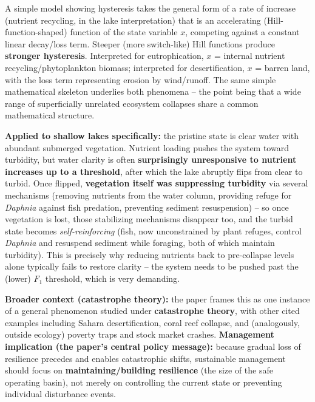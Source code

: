 \documentclass[11pt,a4paper]{article}
\begin{document}
\begin{papbox}[title={Paper Summary: Scheffer, Carpenter, Foley, Folke \& Walker (2001), \textit{Nature} 413:591--596 -- ``Catastrophic Shifts in Ecosystems''}]
\begin{keybox}[title={The minimal ``Box 1'' mathematical model (lakes/desertification)}]
A simple model showing hysteresis takes the general form of a rate of increase (nutrient recycling, in the lake interpretation) that is an accelerating (Hill-function-shaped) function of the state variable $x$, competing against a constant linear decay/loss term. Steeper (more switch-like) Hill functions produce \textbf{stronger hysteresis}. Interpreted for eutrophication, $x$ = internal nutrient recycling/phytoplankton biomass; interpreted for desertification, $x$ = barren land, with the loss term representing erosion by wind/runoff. The same simple mathematical skeleton underlies both phenomena -- the point being that a wide range of superficially unrelated ecosystem collapses share a common mathematical structure.
\end{keybox}

\textbf{Applied to shallow lakes specifically:} the pristine state is clear water with abundant submerged vegetation. Nutrient loading pushes the system toward turbidity, but water clarity is often \textbf{surprisingly unresponsive to nutrient increases up to a threshold}, after which the lake abruptly flips from clear to turbid. Once flipped, \textbf{vegetation itself was suppressing turbidity} via several mechanisms (removing nutrients from the water column, providing refuge for \textit{Daphnia} against fish predation, preventing sediment resuspension) -- so once vegetation is lost, those stabilizing mechanisms disappear too, and the turbid state becomes \emph{self-reinforcing} (fish, now unconstrained by plant refuges, control \textit{Daphnia} and resuspend sediment while foraging, both of which maintain turbidity). This is precisely why reducing nutrients back to pre-collapse levels alone typically fails to restore clarity -- the system needs to be pushed past the (lower) $F_1$ threshold, which is very demanding.

\textbf{Broader context (catastrophe theory):} the paper frames this as one instance of a general phenomenon studied under \textbf{catastrophe theory}, with other cited examples including Sahara desertification, coral reef collapse, and (analogously, outside ecology) poverty traps and stock market crashes. \textbf{Management implication (the paper's central policy message):} because gradual loss of resilience precedes and enables catastrophic shifts, sustainable management should focus on \textbf{maintaining/building resilience} (the size of the safe operating basin), not merely on controlling the current state or preventing individual disturbance events.
\end{papbox}
\end{document}
